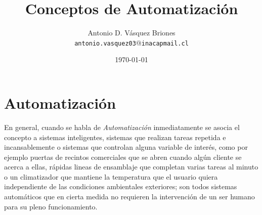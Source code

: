 \documentclass[letterpaper,journal]{ieeetran}
\title{Conceptos de Automatización}
\author{Antonio D. Vásquez Briones\\ \texttt{antonio.vasquez03}@\texttt{inacapmail.cl}}
\date{\today}
\begin{document}
\maketitle
\section{Automatización}
En general, cuando se habla de \emph{Automatización} inmediatamente se asocia el concepto a sistemas inteligentes, sistemas que realizan tareas repetida e incansablemente o sistemas que controlan alguna variable de interés, como por ejemplo puertas de recintos comerciales que se abren cuando algún cliente se acerca a ellas, rápidas lineas de ensamblaje que completan varias tareas al minuto o un climatizador que mantiene la temperatura que el usuario quiera independiente de las condiciones ambientales exteriores; son todos sistemas automáticos que en cierta medida no requieren la intervención de un ser humano para su pleno funcionamiento.
\vspace{10pt}
\end{document}

